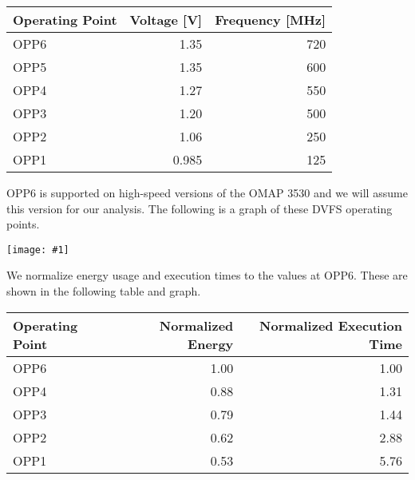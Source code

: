 \documentclass[11pt, letterpaper]{article}
\providecommand{\fig}[1]{
		\noindent
		\begin{center}
			\texttt{[image: \#1]}
		\end{center}
	}
\begin{document}
\begin{tabular}{|l|r|r|}
\hline
Operating Point & Voltage [V] & Frequency [MHz] \\ \hline\hline
OPP6 & 1.35 & 720 \\ \hline   
OPP5 & 1.35 & 600 \\ \hline   
OPP4 & 1.27 & 550 \\ \hline   
OPP3 & 1.20 & 500 \\ \hline   
OPP2 & 1.06 & 250 \\ \hline   
OPP1 & 0.985 & 125 \\ \hline   
\end{tabular}

OPP6 is supported on high-speed versions of the OMAP 3530 and we will assume
this version for our analysis. The following is a graph of these DVFS
operating points.

% 

\fig{dvfs.pdf}

We normalize energy usage and execution times to the values at OPP6. These
are shown in the following table and graph. 

\begin{tabular}{|l|r|r|}
\hline
Operating Point & Normalized Energy & Normalized Execution Time \\ \hline\hline
OPP6 & 1.00 & 1.00 \\ \hline
OPP4 & 0.88 & 1.31 \\ \hline
OPP3 & 0.79 & 1.44 \\ \hline
OPP2 & 0.62 & 2.88 \\ \hline
OPP1 & 0.53 & 5.76 \\ \hline
\end{tabular}
\end{document}
